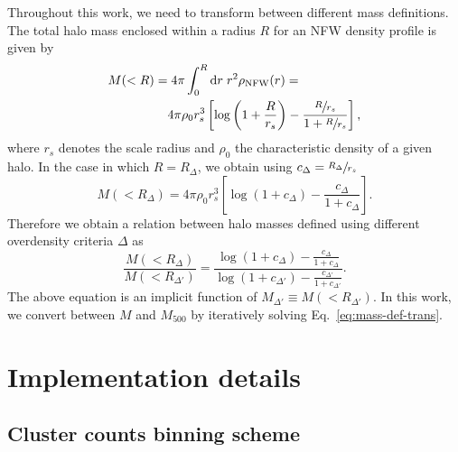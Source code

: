 \documentclass[%
 reprint,
nofootinbib,
 amsmath,amssymb,
 aps,
]{revtex4-1}
\begin{document}
Throughout this work, we need to transform between different mass definitions. The total halo mass enclosed within a radius $R$ for an NFW density profile is given by
\begin{equation}
\begin{aligned}
M(< R) =& \; 4 \pi \int_{0}^{R} \mathrm{d}r \; r^{2} \rho_{\mathrm{NFW}}(r) = \\&4 \pi \rho_{0} r_{s}^{3}\left[\log\left(1 + \frac{R}{r_{s}}\right) - \frac{\sfrac{R}{r_{s}}}{1+\sfrac{R}{r_{s}}} \right],
\end{aligned}
\end{equation} 
where $r_{s}$ denotes the scale radius and $\rho_{0}$ the characteristic density of a given halo.
In the case in which $R = R_{\Delta}$, we obtain using $c_{\Delta} = \sfrac{R_{\Delta}}{r_{s}}$
\begin{equation}
M(< R_{\Delta}) = 4 \pi \rho_{0} r_{s}^{3}\left[\log\left(1 + c_{\Delta}\right) - \frac{c_{\Delta}}{1+c_{\Delta}} \right].
\end{equation} 
Therefore we obtain a relation between halo masses defined using different overdensity criteria $\Delta$ as
\begin{equation}
\frac{M(< R_{\Delta})}{M(< R_{\Delta'})} = \frac{\log\left(1 + c_{\Delta}\right) - \frac{c_{\Delta}}{1+c_{\Delta}}}{\log\left(1 + c_{\Delta'}\right) - \frac{c_{\Delta'}}{1+c_{\Delta'}}}.
\label{eq:mass-def-trans}
\end{equation} 
The above equation is an implicit function of $M_{\Delta'} \equiv M(< R_{\Delta'})$. In this work, we convert between $M$ and $M_{500}$ by iteratively solving Eq.~\ref{eq:mass-def-trans}.

\section{Implementation details}\label{ap:sec:implementation}

\subsection{Cluster counts binning scheme}\label{ap:sec:implementation.counts}
\end{document}
